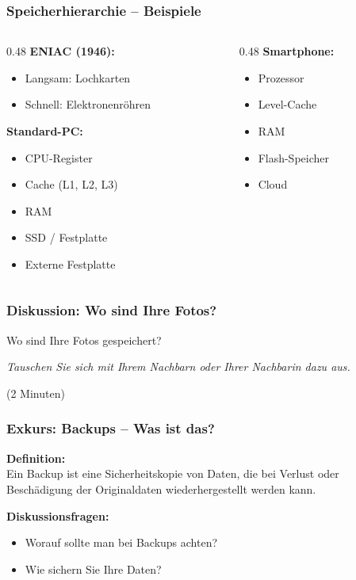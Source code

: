 \documentclass[aspectratio=169]{beamer}
\begin{document}
\begin{frame}
  \frametitle{Speicherhierarchie -- Beispiele}
  \begin{columns}[T]
    \begin{column}{0.48\textwidth}
      \textbf{ENIAC (1946):}
      \begin{itemize}
        \item Langsam: Lochkarten
        \item Schnell: Elektronenröhren
      \end{itemize}
      \vspace{5mm}
      \textbf{Standard-PC:}
      \begin{itemize}
        \item CPU-Register
        \item Cache (L1, L2, L3)
        \item RAM
        \item SSD / Festplatte
        \item Externe Festplatte
      \end{itemize}
    \end{column}
    \begin{column}{0.48\textwidth}
      \textbf{Smartphone:}
      \begin{itemize}
        \item Prozessor
        \item Level-Cache
        \item RAM
        \item Flash-Speicher
        \item Cloud
      \end{itemize}
    \end{column}
  \end{columns}
\end{frame}

\begin{frame}
  \frametitle{Diskussion: Wo sind Ihre Fotos?}
  \begin{center}
    {\Large Wo sind Ihre Fotos gespeichert?}
    \vspace{10mm}

    \textit{Tauschen Sie sich mit Ihrem Nachbarn oder Ihrer Nachbarin dazu aus.}
    \vspace{5mm}

    {\small (2 Minuten)}
  \end{center}
\end{frame}

\begin{frame}
  \frametitle{Exkurs: Backups -- Was ist das?}
  \textbf{Definition:}\\
  Ein Backup ist eine Sicherheitskopie von Daten, die bei Verlust oder Beschädigung der Originaldaten wiederhergestellt werden kann.
  \vspace{8mm}

  \textbf{Diskussionsfragen:}
  \begin{itemize}
    \item Worauf sollte man bei Backups achten?
    \item Wie sichern Sie Ihre Daten?
  \end{itemize}
\end{frame}
\end{document}
